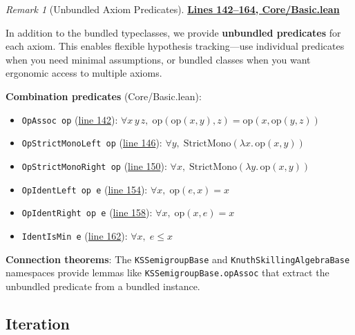 \documentclass[11pt]{article}
\theoremstyle{definition}
\theoremstyle{remark}
\newtheorem{remark}[theorem]{Remark}
\begin{document}
\begin{remark}[Unbundled Axiom Predicates]
\textbf{\href{https://github.com/zariuq/ks-foundations-of-inference/blob/main/KnuthSkilling/Core/Basic.lean\#L142-L164}{Lines 142--164, Core/Basic.lean}}

In addition to the bundled typeclasses, we provide \textbf{unbundled predicates} for each axiom.
This enables flexible hypothesis tracking---use individual predicates when you need minimal assumptions,
or bundled classes when you want ergonomic access to multiple axioms.

\textbf{Combination predicates} (Core/Basic.lean):
\begin{itemize}
  \item \texttt{OpAssoc op} (\href{https://github.com/zariuq/ks-foundations-of-inference/blob/main/KnuthSkilling/Core/Basic.lean\#L142}{line 142}): $\forall x\, y\, z,\; \text{op}(\text{op}(x, y), z) = \text{op}(x, \text{op}(y, z))$
  \item \texttt{OpStrictMonoLeft op} (\href{https://github.com/zariuq/ks-foundations-of-inference/blob/main/KnuthSkilling/Core/Basic.lean\#L146}{line 146}): $\forall y,\; \text{StrictMono}(\lambda x.\, \text{op}(x, y))$
  \item \texttt{OpStrictMonoRight op} (\href{https://github.com/zariuq/ks-foundations-of-inference/blob/main/KnuthSkilling/Core/Basic.lean\#L150}{line 150}): $\forall x,\; \text{StrictMono}(\lambda y.\, \text{op}(x, y))$
  \item \texttt{OpIdentLeft op e} (\href{https://github.com/zariuq/ks-foundations-of-inference/blob/main/KnuthSkilling/Core/Basic.lean\#L154}{line 154}): $\forall x,\; \text{op}(e, x) = x$
  \item \texttt{OpIdentRight op e} (\href{https://github.com/zariuq/ks-foundations-of-inference/blob/main/KnuthSkilling/Core/Basic.lean\#L158}{line 158}): $\forall x,\; \text{op}(x, e) = x$
  \item \texttt{IdentIsMin e} (\href{https://github.com/zariuq/ks-foundations-of-inference/blob/main/KnuthSkilling/Core/Basic.lean\#L162}{line 162}): $\forall x,\; e \leq x$
\end{itemize}

\textbf{Connection theorems}: The \texttt{KSSemigroupBase} and \texttt{KnuthSkillingAlgebraBase} namespaces
provide lemmas like \texttt{KSSemigroupBase.opAssoc} that extract the unbundled predicate from a bundled instance.
\end{remark}

\subsection{Iteration}
\end{document}
